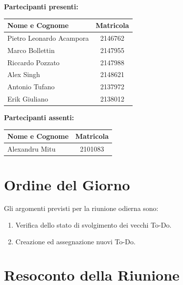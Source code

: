 \documentclass[a4paper, 11pt]{article}
\begin{document}
\vspace{0.5cm}
\textbf{Partecipanti presenti:} \\
\vspace{0.2cm}
\renewcommand{\arraystretch}{1.2}
\begin{tabularx}{0.8\textwidth}{|X|c|}
\hline
\textbf{Nome e Cognome} & \textbf{Matricola} \\ \hline
Pietro Leonardo Acampora & 2146762 \\ \hline
Marco Bollettin & 2147955 \\ \hline
Riccardo Pozzato & 2147988 \\ \hline
Alex Singh & 2148621 \\ \hline
Antonio Tufano & 2137972 \\ \hline
Erik Giuliano & 2138012 \\ \hline
\end{tabularx}

\vspace{0.5cm}
\textbf{Partecipanti assenti:} \\
\vspace{0.2cm}
\renewcommand{\arraystretch}{1.2}
\begin{tabularx}{0.8\textwidth}{|X|c|}
\hline
\textbf{Nome e Cognome} & \textbf{Matricola} \\ \hline
 Alexandru Mitu & 2101083 \\ \hline
\end{tabularx}

\vspace{0.5cm}
\section{Ordine del Giorno}
Gli argomenti previsti per la riunione odierna sono:
\begin{enumerate}
    \item Verifica dello stato di svolgimento dei vecchi To-Do.
    \item Creazione ed assegnazione nuovi To-Do.
\end{enumerate}

\newpage
\section{Resoconto della Riunione}
\end{document}
